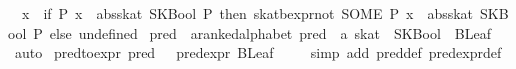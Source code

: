 \begin{isabellebody}
\ \ {}{}x\ {}\ if\ {}{}P{}\ x\ {}\ abs{}skat\ {}SKBool\ P{}{}\ then\ skat{}bexpr{}not\ {}SOME\ P{}\ x\ {}\ abs{}skat\ {}SKBool\ P{}{}\ else\ undefined{}\isanewline
\isanewline
{}\isamarkupfalse%
\ pred\ {}{}\ {}{}a{}{}ranked{}alphabet\ pred\ {}\ {}a\ skat{}\ \ {}SKBool\ {}\ BLeaf{}%
\isadelimproof
\ %
\endisadelimproof
%
\isatagproof
{}\isamarkupfalse%
\ auto%
\endisatagproof
{\isafoldproof}%
%
\isadelimproof
%
\endisadelimproof
\isanewline
\isanewline
{}\isamarkupfalse%
\ pred{}to{}expr{}\ {}pred\ {}\ {}\ pred{}expr\ {}BLeaf\ {}{}{}\isanewline
%
\isadelimproof
\ \ %
\endisadelimproof
%
\isatagproof
{}\isamarkupfalse%
\ {}simp\ add{}\ pred{}def\ pred{}expr{}def{}%
\endisatagproof

\end{isabellebody}
